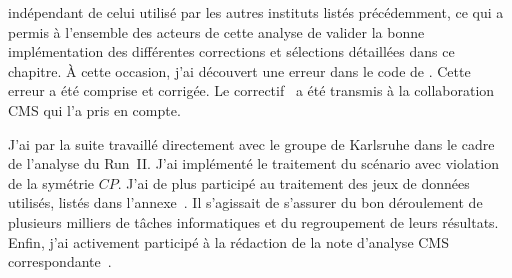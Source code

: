 indépendant de celui utilisé par les autres instituts listés précédemment,
ce qui a permis à l'ensemble des acteurs de cette analyse de valider la bonne implémentation des différentes corrections et sélections détaillées dans ce chapitre.
À cette occasion, j'ai découvert une erreur dans le code de \COMBINE.
Cette erreur a été comprise et corrigée.
Le correctif~\cite{BBB_PR} a été transmis à la collaboration CMS qui l'a pris en compte.
\par
J'ai par la suite travaillé directement avec le groupe de Karlsruhe dans le cadre de l'analyse du Run~II.
J'ai implémenté le traitement du scénario avec violation de la symétrie $CP$.
J'ai de plus participé au traitement des jeux de données utilisés, listés dans l'annexe~.
Il s'agissait de s'assurer du bon déroulement de plusieurs milliers de tâches informatiques et du regroupement de leurs résultats.
Enfin, j'ai activement participé à la rédaction de la note d'analyse CMS correspondante~\cite{CMS-NOTE-2020-218}.
